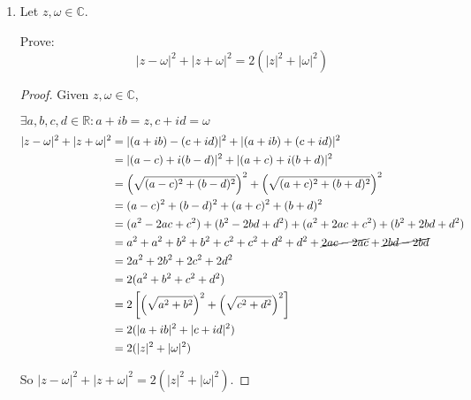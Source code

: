 \documentclass[12pt,letterpaper]{article}
\begin{document}
\begin{enumerate}
\begin{proof}
        Now let's multiply the first equation by $c$ and the second by $a$.
        \begin{alignat*}{3}
          acx_1 & {} + {} & bcx_2 & {} = {} & 0 \\
          acx_1 & {} + {} & adx_2 & {} = {} & 0
        \end{alignat*}

        Now let's subtract the first equation from the second.
        \begin{align*}
          (acx_1 + adx_2) - (acx_1 + bcx_2) &= 0 - 0 \\
          acx_1 - acx_1 + adx_2 - bcx_2 &= 0 \\
          adx_2 - bcx_2 &= 0 \\
          (ad - bc)x_2 &= 0
        \end{align*}

        Again, we assumed that $ad - bc \neq 0$ so we divide by $ad - bc$.
        \[x_2 = 0\]

        So $x_1 = x_2 = 0$.
        Thus if $ad - bc \neq 0$, then $x_1 = x_2 = 0$.

      \end{proof}

    \item
      Let $z, \omega \in \mathbb{C}$.

      Prove:
      \[|z - \omega|^2 + |z + \omega|^2 = 2(|z|^2 + |\omega|^2)\]

      \begin{proof}
        Given $z, \omega \in \mathbb{C}$,

        $\exists a, b, c, d \in \mathbb{R} : a + ib = z, c + id = \omega$
        \begin{align*}
          |z - \omega|^2 + |z + \omega|^2 &=
            |(a + ib) - (c + id)|^2 + |(a + ib) + (c + id)|^2 \\
          &= |(a - c) + i(b - d)|^2 + |(a + c) + i(b + d)|^2 \\
          &= \left(\sqrt{(a - c)^2 + (b - d)^2}\right)^2 +
            \left(\sqrt{(a + c)^2 + (b + d)^2}\right)^2 \\
          &= (a - c)^2 + (b - d)^2 + (a + c)^2 + (b + d)^2 \\
          &= (a^2 - 2ac + c^2) + (b^2 - 2bd + d^2) +
            (a^2 + 2ac + c^2) + (b^2 + 2bd + d^2) \\
          &= a^2 + a^2 + b^2 + b^2 + c^2 + c^2 + d^2 + d^2 +
            \cancel{2ac - 2ac} + \cancel{2bd - 2bd} \\
          &= 2a^2 + 2b^2 + 2c^2 + 2d^2 \\
          &= 2(a^2 + b^2 + c^2 + d^2) \\
          &= 2\left[\left(\sqrt{a^2 + b^2}\right)^2 + \left(\sqrt{c^2 + d^2}\right)^2\right] \\
          &= 2(|a + ib|^2 + |c + id|^2) \\
          &= 2(|z|^2 + |\omega|^2)
        \end{align*}

        So $|z - \omega|^2 + |z + \omega|^2 = 2(|z|^2 + |\omega|^2)$.
      \end{proof}
  \end{enumerate}
\end{document}
